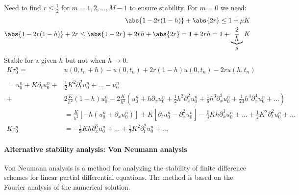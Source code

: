 \begin{example}{}{}
  Need to find \( r \leq \frac{1}{2} \) for \(m = 1, 2, \ldots, M-1\) to ensure stability.
  For \( m = 0 \) we need:
  \begin{align*}
    \abs{1 - 2r(1 - h)} + \abs{2r} \leq 1 + \mu K \\
    \abs{1 - 2r(1 - h)} + 2r \leq \abs{1 - 2r} + 2rh + \abs{2r} = 1 + 2rh = 1 + \underbrace{\frac{2}{h}}_{\mu}K
  \end{align*}
  Stable for a given \( h \) but not when \( h \to 0 \).
  \begin{align*}
    K \tau_0^n =                              & u(0, t_n + h) - u(0, t_n) + 2r(1 - h)u(0, t_n) - 2ru(h, t_n)                                                                                                                                            \\                                                                                                                                                                                                                    \\
    =            u_0^n + K \partial_t u_0^n + & \frac{1}{2}K^2 \partial_t^2 u_0^n + \ldots - u_0^n                                                                                                                                                      \\
    +                                         & 2\frac{K}{h^2}(1 - h)u_0^n - 2\frac{K}{h^2}(u_0^n + h \partial_x u_0^n + \frac{1}{2}h^2 \partial_x^2 u_0^n + \frac{1}{6}h^3 \partial_x^3 u_0^n + \frac{1}{24}h^4 \partial_x^4 u_0^n + \ldots)           \\
                                              & = \frac{K}{h^2}\left[-h(u_0^n + \partial_x u_0^n)\right] + K \left[\partial_t u_0^n - \partial_x^2 u_0^n\right] - \frac{1}{3}Kh\partial_x^3 u_0^n + \ldots + \frac{1}{2}K^2 \partial_t^2 u_0^n + \ldots \\
    K \tau_0^n                                & = -\frac{1}{3}Kh\partial_x^3 u_0^n + \ldots + \frac{1}{2}K^2 \partial_t^2 u_0^n + \ldots \tag{Consistency}
  \end{align*}
\end{example}

\paragraph{Alternative stability analysis: Von Neumann analysis}
Von Neumann analysis is a method for analyzing the stability of finite difference schemes for linear partial differential equations.
The method is based on the Fourier analysis of the numerical solution.

